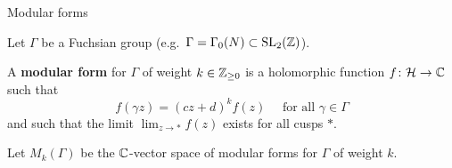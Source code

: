 \begin{frame}{Modular forms}



Let $\Gamma$  be a Fuchsian group (e.g.~$\Gamma = \Gamma_0(N) \subset   \operatorname{SL}_2(\mathbb{Z})$).


\begin{definition}
A \textbf{modular form} for $\Gamma$ of weight $k \in \mathbb{Z}_{\geq 0}$ is a holomorphic function $f\colon{\mathcal H} \to \mathbb{C}$ such that
\begin{equation*}
 f(\gamma z) = (cz+d)^k f(z) \quad \text{ for all } \gamma \in \Gamma 
\end{equation*}
and such that the limit $\lim_{z \to *} f(z)$ exists for all cusps $*$.
\end{definition}

\begin{definition}
  Let $M_k(\Gamma)$ be the $\mathbb{C}$-vector space of modular forms for $\Gamma$ of weight $k$.    
\end{definition}


  







\end{frame}
